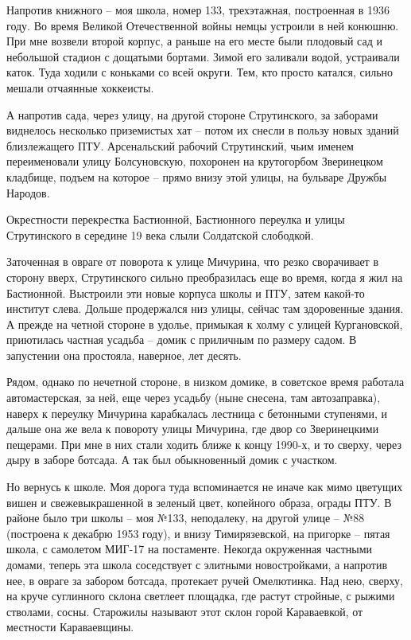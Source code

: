 
Напротив книжного – моя школа, номер 133, трехэтажная, построенная в 1936 году. Во время Великой Отечественной войны немцы устроили в ней конюшню. При мне возвели второй корпус, а раньше на его месте были плодовый сад и небольшой стадион с дощатыми бортами. Зимой его заливали водой, устраивали каток. Туда ходили с коньками со всей округи. Тем, кто просто катался, сильно мешали отчаянные хоккеисты.

А напротив сада, через улицу, на другой стороне Струтинского, за заборами виднелось несколько приземистых хат – потом их снесли в пользу новых зданий близлежащего ПТУ. Арсенальский рабочий Струтинский, чьим именем  переименовали улицу Болсуновскую, похоронен на крутогорбом Зверинецком кладбище, подъем на которое – прямо внизу этой улицы, на бульваре Дружбы Народов.

Окрестности перекрестка Бастионной, Бастионного переулка и улицы Струтинского в середине 19 века слыли Солдатской слободкой.

Заточенная в овраге от поворота к улице Мичурина, что резко сворачивает в сторону вверх, Струтинского сильно преобразилась еще во время, когда я жил на Бастионной. Выстроили эти новые корпуса школы и ПТУ, затем какой-то институт слева. Дольше продержался низ улицы, сейчас там здоровенные здания. А прежде на четной стороне в удолье, примыкая к холму с улицей Кургановской, приютилась частная усадьба – домик с приличным по размеру садом. В запустении она простояла, наверное, лет десять.

Рядом, однако по нечетной стороне, в низком домике, в советское время работала автомастерская, за ней, еще через усадьбу (ныне снесена, там автозаправка), наверх к переулку Мичурина карабкалась лестница с бетонными ступенями, и дальше она же вела к повороту улицы Мичурина, где двор со Зверинецкими пещерами. При мне в них стали ходить ближе к концу 1990-х, и то сверху, через дыру в заборе ботсада. А так был обыкновенный домик с участком.

Но вернусь к школе. Моя дорога туда вспоминается не иначе как мимо цветущих вишен и свежевыкрашенной в зеленый цвет, копейного образа, ограды ПТУ. В районе было три школы – моя №133, неподалеку, на другой улице – №88 (построена к декабрю 1953 году), и внизу Тимирязевской, на пригорке – пятая школа, с самолетом МИГ-17 на постаменте. Некогда окруженная частными домами, теперь эта школа соседствует с элитными новостройками, а напротив нее, в овраге за забором ботсада, протекает ручей Омелютинка. Над нею, сверху, на круче суглинного склона светлеет площадка, где растут стройные, с рыжими стволами, сосны. Старожилы называют этот склон горой Караваевкой, от местности Караваевщины.

